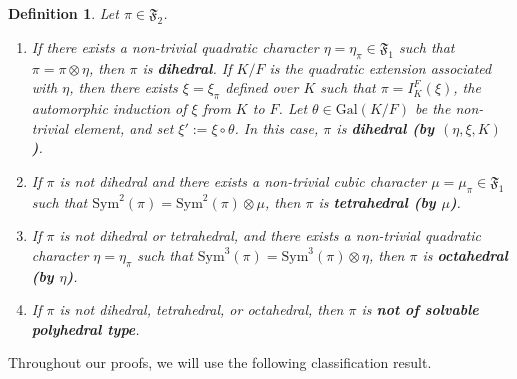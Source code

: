 \documentclass[11pt]{amsart}
\newtheorem{definition}[theorem]{Definition}
\theoremstyle{remark}
\newcommand{\Sym}{\mathrm{Sym}}
\numberwithin{equation}{section}
\begin{document}
\begin{definition}
Let $\pi\in\mathfrak{F}_2$.
\begin{enumerate}[leftmargin=*]
    \item If there exists a non-trivial quadratic character $\eta=\eta_{\pi}\in\mathfrak{F}_1$ such that $\pi = \pi \otimes \eta$, then $\pi$ is {\bf dihedral}.  If $K/F$ is the quadratic extension associated with $\eta$, then there exists $\xi=\xi_{\pi}$ defined over $K$ such that $\pi=I_K^F(\xi)$, the automorphic induction of $\xi$ from $K$ to $F$.  Let $\theta \in \mathrm{Gal}(K/F)$ be the non-trivial element, and set $\xi' := \xi \circ \theta$. In this case, $\pi$ is {\bf dihedral (by $(\eta,\xi,K)$)}.
    \item If $\pi$ is not dihedral and there exists a non-trivial cubic character $\mu=\mu_{\pi}\in\mathfrak{F}_1$ such that $\Sym^2(\pi) = \Sym^2(\pi) \otimes \mu$, then $\pi$ is {\bf tetrahedral (by $\mu$)}.
    \item If $\pi$ is not dihedral or tetrahedral, and there exists a non-trivial quadratic character $\eta=\eta_{\pi}$ such that $\Sym^3(\pi) = \Sym^3(\pi) \otimes \eta$, then $\pi$ is {\bf octahedral (by $\eta$)}.
    \item If $\pi$ is not dihedral, tetrahedral, or octahedral, then $\pi$ is {\bf not of solvable polyhedral type}.
\end{enumerate}
\end{definition}

Throughout our proofs, we will use the following classification result.
\end{document}
